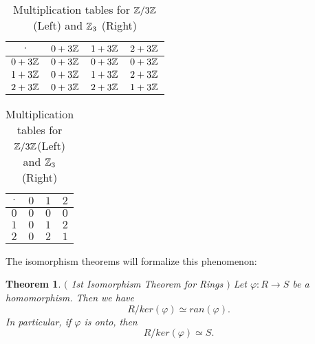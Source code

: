 \documentclass[12pt]{article}
\theoremstyle{plain}
\newtheorem{theorem}{Theorem}
\theoremstyle{definition}
\theoremstyle{remark}
\begin{document}
\begin{table}[H]
\qquad \quad \quad \quad
\begin{tabular}{ c| c | c | c}
$\cdot$  & $0+3\mathbb{Z}$ & $1+3\mathbb{Z}$ & $2+3\mathbb{Z}$ \\
\hline
$0+3\mathbb{Z}$ & $0+3\mathbb{Z}$ & $0+3\mathbb{Z}$ & $0+3\mathbb{Z}$  \\ 
\hline
$1+3\mathbb{Z}$ & $0+3\mathbb{Z}$ & $1+3\mathbb{Z}$ & $2+3\mathbb{Z}$  \\ 
\hline
$2+3\mathbb{Z}$ & $0+3\mathbb{Z}$ & $2+3\mathbb{Z}$ & $1+3\mathbb{Z}$ \\ 
\hline
\end{tabular}
\quad \quad \quad \quad \quad \quad \quad \quad \quad
\begin{tabular}{ c| c | c | c}
$\cdot$ & $0$ & $1$ & $2$ \\
\hline
$0$ & $0$ & $0$ & $0$  \\ 
\hline
$1$ & $0$ & $1$ & $2$  \\ 
\hline
$2$ & $0$ & $2$ & $1$ \\ 
\hline
\end{tabular}

\caption{Multiplication tables for $\mathbb{Z}/3\mathbb{Z}$(Left) and $\mathbb{Z}_3$ (Right)}
\end{table}

The isomorphism theorems will formalize this phenomenon:
\begin{theorem}$($ 1st Isomorphism Theorem for Rings $)$
Let $\varphi: R\rightarrow S$ be a homomorphism. Then we have
$$R/ker(\varphi) \simeq ran(\varphi).$$
In particular, if $\varphi$ is onto, then 
$$R/ker(\varphi) \simeq S. $$
\end{theorem}
\end{document}
